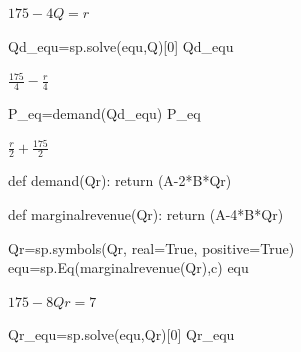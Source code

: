 \documentclass[
  12pt,
  a4paper,
  DIV=11,
  numbers=noendperiod]{scrartcl}
\newenvironment{Shaded}{\begin{snugshade}}{\end{snugshade}}
\newcommand{\ControlFlowTok}[1]{\textcolor[rgb]{0.00,0.23,0.31}{#1}}
\newcommand{\DecValTok}[1]{\textcolor[rgb]{0.68,0.00,0.00}{#1}}
\newcommand{\KeywordTok}[1]{\textcolor[rgb]{0.00,0.23,0.31}{#1}}
\newcommand{\NormalTok}[1]{\textcolor[rgb]{0.00,0.23,0.31}{#1}}
\newcommand{\OperatorTok}[1]{\textcolor[rgb]{0.37,0.37,0.37}{#1}}
\newcommand{\StringTok}[1]{\textcolor[rgb]{0.13,0.47,0.30}{#1}}
\newcommand{\VariableTok}[1]{\textcolor[rgb]{0.07,0.07,0.07}{#1}}
\begin{document}
$\displaystyle 175 - 4 Q = r$

\begin{Shaded}
\begin{Highlighting}[]
\NormalTok{Qd\_equ}\OperatorTok{=}\NormalTok{sp.solve(equ,Q)[}\DecValTok{0}\NormalTok{]}
\NormalTok{Qd\_equ}
\end{Highlighting}
\end{Shaded}

$\displaystyle \frac{175}{4} - \frac{r}{4}$

\begin{Shaded}
\begin{Highlighting}[]
\NormalTok{P\_eq}\OperatorTok{=}\NormalTok{demand(Qd\_equ)}
\NormalTok{P\_eq}
\end{Highlighting}
\end{Shaded}

$\displaystyle \frac{r}{2} + \frac{175}{2}$

\begin{Shaded}
\begin{Highlighting}[]
\KeywordTok{def}\NormalTok{ demand(Qr):}
    \ControlFlowTok{return}\NormalTok{ (A}\OperatorTok{{-}}\DecValTok{2}\OperatorTok{*}\NormalTok{B}\OperatorTok{*}\NormalTok{Qr)}

\KeywordTok{def}\NormalTok{ marginalrevenue(Qr):}
    \ControlFlowTok{return}\NormalTok{ (A}\OperatorTok{{-}}\DecValTok{4}\OperatorTok{*}\NormalTok{B}\OperatorTok{*}\NormalTok{Qr)}
\end{Highlighting}
\end{Shaded}

\begin{Shaded}
\begin{Highlighting}[]
\NormalTok{Qr}\OperatorTok{=}\NormalTok{sp.symbols(}\StringTok{\textquotesingle{}Qr\textquotesingle{}}\NormalTok{, real}\OperatorTok{=}\VariableTok{True}\NormalTok{, positive}\OperatorTok{=}\VariableTok{True}\NormalTok{)}
\NormalTok{equ}\OperatorTok{=}\NormalTok{sp.Eq(marginalrevenue(Qr),c)}
\NormalTok{equ}
\end{Highlighting}
\end{Shaded}

$\displaystyle 175 - 8 Qr = 7$

\begin{Shaded}
\begin{Highlighting}[]
\NormalTok{Qr\_equ}\OperatorTok{=}\NormalTok{sp.solve(equ,Qr)[}\DecValTok{0}\NormalTok{]}
\NormalTok{Qr\_equ}
\end{Highlighting}
\end{Shaded}
\end{document}
